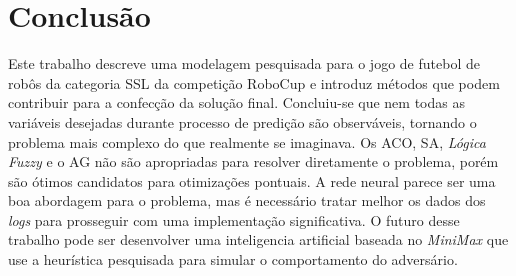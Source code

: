 \chapter{Conclusão}\label{cap:conclusao}

Este trabalho descreve uma modelagem pesquisada para o jogo de futebol de robôs
da categoria SSL da competição RoboCup e introduz métodos que podem contribuir
para a confecção da solução final. Concluiu-se que nem todas as variáveis
desejadas durante  processo de predição são observáveis, tornando o problema
mais complexo do que realmente se imaginava. Os ACO, SA,
\textit{Lógica Fuzzy} e o AG não são apropriadas para resolver diretamente o
problema, porém são ótimos candidatos para otimizações pontuais. A rede neural
parece ser uma boa abordagem para o problema, mas é necessário tratar melhor os
dados dos \textit{logs} para prosseguir com uma implementação significativa.
O futuro desse trabalho pode ser desenvolver uma inteligencia artificial baseada
no \textit{MiniMax} que use a heurística pesquisada para simular o comportamento
do adversário.


